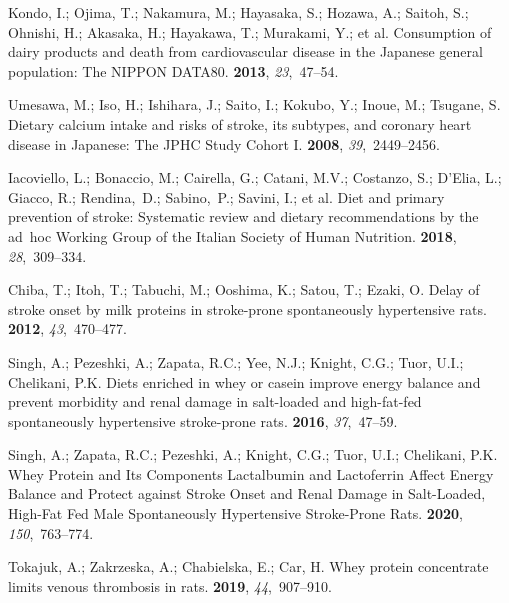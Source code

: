 \documentclass[nutrients,article,accept,moreauthors,pdftex]{Definitions/mdpi}
\begin{document}
\begin{thebibliography}{999}
Kondo, I.; Ojima, T.; Nakamura, M.; Hayasaka, S.; Hozawa, A.; Saitoh, S.;
  Ohnishi, H.; Akasaka, H.; Hayakawa, T.; Murakami, Y.; et al.
\newblock Consumption of dairy products and death from cardiovascular disease
  in the Japanese general population: The NIPPON DATA80.
 {\bf 2013}, {\em 23},~47--54.

Umesawa, M.; Iso, H.; Ishihara, J.; Saito, I.; Kokubo, Y.; Inoue, M.; Tsugane,
  S.
\newblock Dietary calcium intake and risks of stroke, its subtypes, and
  coronary heart disease in Japanese: The JPHC Study Cohort I.
 {\bf 2008}, {\em 39},~2449--2456.

Iacoviello, L.; Bonaccio, M.; Cairella, G.; Catani, M.V.; Costanzo, S.; D'Elia,
  L.; Giacco, R.; Rendina,~D.; Sabino,~P.; Savini, I.; et al.
\newblock Diet and primary prevention of stroke: Systematic review and dietary
  recommendations by the ad~hoc Working Group of the Italian Society of Human
  Nutrition.
 {\bf 2018},
  {\em 28},~309--334.

Chiba, T.; Itoh, T.; Tabuchi, M.; Ooshima, K.; Satou, T.; Ezaki, O.
\newblock Delay of stroke onset by milk proteins in stroke-prone spontaneously
  hypertensive rats.
 {\bf 2012}, {\em 43},~470--477.

Singh, A.; Pezeshki, A.; Zapata, R.C.; Yee, N.J.; Knight, C.G.; Tuor, U.I.;
  Chelikani, P.K.
\newblock Diets enriched in whey or casein improve energy balance and prevent
  morbidity and renal damage in salt-loaded and high-fat-fed spontaneously
  hypertensive stroke-prone rats.
 {\bf 2016}, {\em
  37},~47--59.

Singh, A.; Zapata, R.C.; Pezeshki, A.; Knight, C.G.; Tuor, U.I.; Chelikani,
  P.K.
\newblock Whey Protein and Its Components Lactalbumin and Lactoferrin Affect
  Energy Balance and Protect against Stroke Onset and Renal Damage in
  Salt-Loaded, High-Fat Fed Male Spontaneously Hypertensive Stroke-Prone Rats.
 {\bf 2020}, {\em 150},~763--774.

Tokajuk, A.; Zakrzeska, A.; Chabielska, E.; Car, H.
\newblock Whey protein concentrate limits venous thrombosis in rats.
 {\bf 2019}, {\em
  44},~907--910.

\end{thebibliography}
\end{document}
